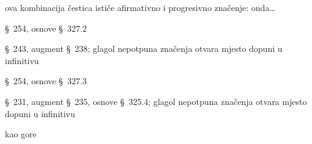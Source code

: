 \begin{description}[noitemsep]
\item[μὲν δὴ] ova kombinacija čestica ističe afirmativno i progresivno značenje: onda\dots 
\item[ἦλθε] §~254, osnove §~327.2
\item[ἐπεθύμει] §~243, augment §~238; glagol nepotpuna značenja otvara mjesto dopuni u infinitivu
\item[ἰδεῖν] §~254, osnove §~327.3
\item[ἤθελεν] §~231, augment §~235, osnove §~325.4; glagol nepotpuna značenja otvara mjesto dopuni u infinitivu
\item[ἰδεῖν] kao gore
\end{description}




